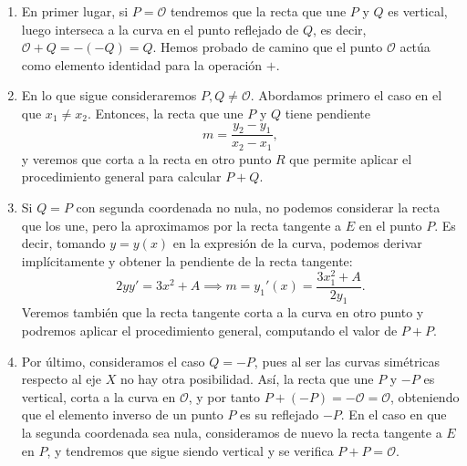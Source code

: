 \documentclass[
  a4paper,
  12pt,
  spanish,
]{scrartcl}
\begin{document}
\begin{enumerate}
    \item En primer lugar, si $P=\mathcal{O}$ tendremos que la recta que une $P$ y $Q$ es vertical, luego interseca a la curva en el punto reflejado de $Q$, es decir, $\mathcal{O} + Q = - (-Q) = Q$. Hemos probado de camino que el punto $\mathcal{O}$ actúa como elemento identidad para la operación $+$.
    \item En lo que sigue consideraremos $P, Q \neq \mathcal{O}$. Abordamos primero el caso en el que $x_1 \neq x_2$. Entonces, la recta que une $P$ y $Q$ tiene pendiente \[ m = \frac{y_2 - y_1}{x_2 - x_1}, \] y veremos que corta a la recta en otro punto $R$ que permite aplicar el procedimiento general para calcular $P+Q$.	
    \item Si $Q = P$ con segunda coordenada no nula, no podemos considerar la recta que los une, pero la aproximamos por la recta tangente a $E$ en el punto $P$. Es decir, tomando $y = y(x)$ en la expresión de la curva, podemos derivar implícitamente y obtener la pendiente de la recta tangente: \[ 2yy' = 3x^2 + A \implies m = y_1'(x) = \frac{3x_1^2 + A}{2y_1}. \]  Veremos también que la recta tangente corta a la curva en otro punto y podremos aplicar el procedimiento general, computando el valor de $P + P$.
    \item Por último, consideramos el caso $Q = -P$, pues al ser las curvas simétricas respecto al eje $X$ no hay otra posibilidad. Así, la recta que une $P$ y $-P$ es vertical, corta a la curva en $\mathcal{O}$, y por tanto $P + (-P) = -\mathcal{O} = \mathcal{O}$, obteniendo que el elemento inverso de un punto $P$ es su reflejado $-P$. En el caso en que la segunda coordenada sea nula, consideramos de nuevo la recta tangente a $E$ en $P$, y tendremos que sigue siendo vertical y se verifica $P + P = \mathcal{O}$.
\end{enumerate}
\end{document}
